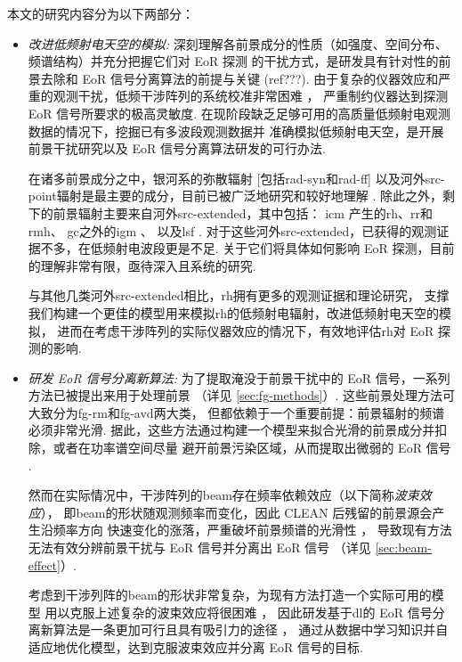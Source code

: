 本文的研究内容分为以下两部分：
\begin{itemize}
\item
\emph{改进低频射电天空的模拟:}
深刻理解各前景成分的性质（如强度、空间分布、频谱结构）并充分把握它们对 EoR 探测
的干扰方式，是研发具有针对性的前景去除和 EoR 信号分离算法的前提与关键 (ref???).
由于复杂的仪器效应和严重的观测干扰，低频干涉阵列的系统校准非常困难
\cite{noordam2004,intema2009,wijnholds2010,barry2016,gehlot2018}，
严重制约仪器达到探测 EoR 信号所要求的极高灵敏度.
在现阶段缺乏足够可用的高质量低频射电观测数据的情况下，挖掘已有多波段观测数据并
准确模拟低频射电天空，是开展前景干扰研究以及 EoR 信号分离算法研发的可行办法.

\hspace{2\ccwd}%
在诸多前景成分之中，银河系的弥散辐射 [包括\ac{rad-syn}和\ac{rad-ff}]
以及河外\ac{src-point}辐射是最主要的成分，目前已被广泛地研究和较好地理解
\cite{shaver1999,diMatteo2004,gleser2008,liu2012,murray2017,spinelli2018}.
除此之外，剩下的前景辐射主要来自河外\ac{src-extended}，其中包括：
\ac{icm} \cite{feretti2012} 产生的\ac{rh}、\ac{rr}和\ac{rmh}、
\ac{gc}之外的\ac{igm} \cite{keshet2004}、
以及\ac{lsf} \cite{vazza2015}.
对于这些河外\ac{src-extended}，已获得的观测证据不多，在低频射电波段更是不足.
关于它们将具体如何影响 EoR 探测，目前的理解非常有限，亟待深入且系统的研究.

\hspace{2\ccwd}%
与其他几类河外\ac{src-extended}相比，\ac{rh}拥有更多的观测证据和理论研究，
支撑我们构建一个更佳的模型用来模拟\ac{rh}的低频射电辐射，改进低频射电天空的模拟，
进而在考虑干涉阵列的实际仪器效应的情况下，有效地评估\ac{rh}对 EoR 探测的影响.

\item
\emph{研发 EoR 信号分离新算法:}
为了提取淹没于前景干扰中的 EoR 信号，一系列方法已被提出来用于处理前景
（详见 \autoref{sec:fg-methods}）.
这些前景处理方法可大致分为\ac{fg-rm}和\ac{fg-avd}两大类，
但都依赖于一个重要前提：前景辐射的频谱必须非常光滑.
据此，这些方法通过构建一个模型来拟合光滑的前景成分并扣除，或者在功率谱空间尽量
避开前景污染区域，从而提取出微弱的 EoR 信号 \cite{chapman2016}.

\hspace{2\ccwd}%
然而在实际情况中，干涉阵列的\ac{beam}存在频率依赖效应（以下简称\emph{波束效应}），
即\ac{beam}的形状随观测频率而变化，因此 CLEAN 后残留的前景源会产生沿频率方向
快速变化的涨落，严重破坏前景频谱的光滑性 \cite{liu2009ps}，
导致现有方法无法有效分辨前景干扰与 EoR 信号并分离出 EoR 信号
（详见 \autoref{sec:beam-effect}）.

\hspace{2\ccwd}%
考虑到干涉列阵的\ac{beam}的形状非常复杂，为现有方法打造一个实际可用的模型
用以克服上述复杂的波束效应将很困难 \cite{lochner2015}，
因此研发基于\ac{dl}的 EoR 信号分离新算法是一条更加可行且具有吸引力的途径
\cite{herbel2018,vafaeiSadr2019}，
通过从数据中学习知识并自适应地优化模型，达到克服波束效应并分离 EoR 信号的目标.

\end{itemize}

